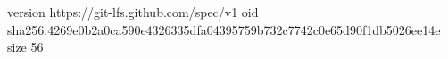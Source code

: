 version https://git-lfs.github.com/spec/v1
oid sha256:4269e0b2a0ca590e4326335dfa04395759b732c7742c0e65d90f1db5026ee14e
size 56
